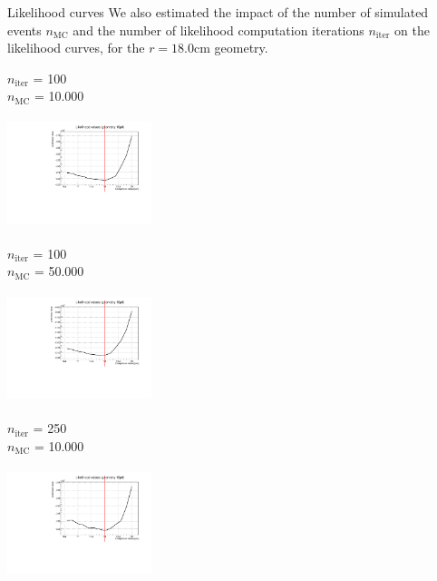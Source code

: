 \documentclass[handout,8 pt]{beamer}
\begin{document}
\begin{frame}{Likelihood curves}
\justifying
We also estimated the impact of the number of simulated events $n_{\text{MC}}$ and the number of likelihood computation iterations $n_{\text{iter}}$ on the likelihood curves, for the $r = 18.0$cm geometry. \vfill

\begin{minipage}[c]{.32\textwidth}
\begin{exampleblock}{} \begin{center}$n_\text{iter}$ = 100 \\ $n_\text{MC}$ = 10.000 \end{center} \end{exampleblock} \vspace{5pt}
\includegraphics[width=4.2cm, height=3.2cm]{figs/likelihood100LowStat/likelihood18p0.pdf} 
\end{minipage}
\begin{minipage}[c]{.32\textwidth}
\begin{exampleblock}{} \begin{center}$n_\text{iter}$ = 100 \\ $n_\text{MC}$ = 50.000\end{center} \end{exampleblock} \vspace{5pt}
\includegraphics[width=4.2cm, height=3.2cm]{figs/likelihood100HighStat/likelihood18p0.pdf} 
\end{minipage}
\begin{minipage}[c]{.32\textwidth}
\begin{exampleblock}{} \begin{center}$n_\text{iter}$ = 250 \\ $n_\text{MC}$ = 10.000 \end{center} \end{exampleblock} \vspace{5pt}
\includegraphics[width=4.2cm, height=3.2cm]{figs/likelihood250LowStat/likelihood18p0.pdf} 
\end{minipage} \vfill


\end{frame}
\end{document}
